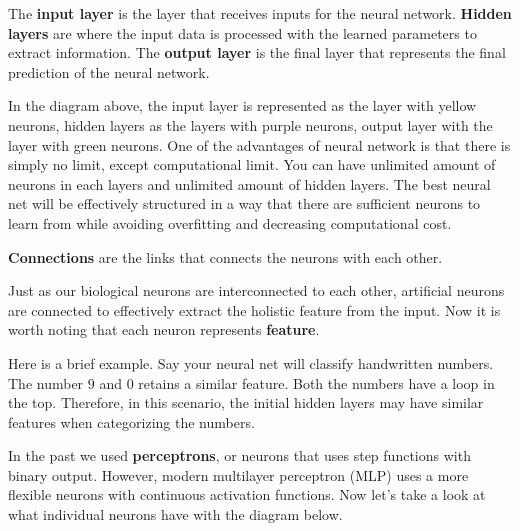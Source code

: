 \documentclass[../../../main.tex]{subfiles}
\begin{document}
\begin{definition}{}{}
The \textbf{input layer} is the layer that receives inputs
for the neural network. \textbf{Hidden layers} are where the
input data is processed with the learned parameters to extract
information. The \textbf{output layer} is the final layer that
represents the final prediction of the neural network.
\end{definition}

In the diagram above, the input layer is represented as the
layer with yellow neurons, hidden layers as the layers with
purple neurons, output layer with the layer with green neurons.
One of the advantages of neural network is that there is simply
no limit, except computational limit. You can have unlimited
amount of neurons in each layers and unlimited amount of hidden
layers. The best neural net will be effectively structured in
a way that there are sufficient neurons to learn from while
avoiding overfitting and decreasing computational cost.

\begin{definition}{}{}
\textbf{Connections} are the links that connects the neurons
with each other.
\end{definition}

Just as our biological neurons are interconnected to each other,
artificial neurons are connected to effectively extract the
holistic feature from the input. Now it is worth noting that
each neuron represents \textbf{feature}.

Here is a brief example. Say your neural net will classify
handwritten numbers. The number $9$ and $0$ retains a similar
feature. Both the numbers have a loop in the top. Therefore,
in this scenario, the initial hidden layers may have similar
features when categorizing the numbers.

In the past we used \textbf{perceptrons}, or neurons that uses
step functions with binary output. However, modern multilayer
perceptron (MLP) uses a more flexible neurons with continuous
activation functions. Now let's take a look at what individual
neurons have with the diagram below.
\end{document}
